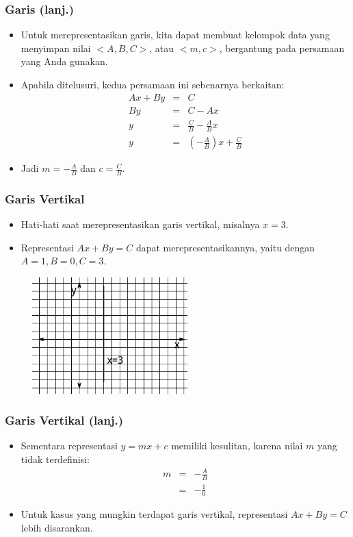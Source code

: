 \begin{frame}
\frametitle{Garis (lanj.)}
\begin{itemize}
  \item Untuk merepresentasikan garis, kita dapat membuat kelompok data yang menyimpan nilai $<A, B, C>$, atau $<m, c>$, bergantung pada persamaan yang Anda gunakan. 
  \item Apabila ditelusuri, kedua persamaan ini sebenarnya berkaitan:
\begin{eqnarray*}
Ax + By &=& C \\
By &=& C - Ax \\
y &=& \frac{C}{B} - \frac{A}{B}x \\
y &=& \left(-\frac{A}{B}\right)x + \frac{C}{B} 
\end{eqnarray*}
  \item Jadi $m = -\frac{A}{B}$ dan $c = \frac{C}{B}$.
\end{itemize}
\end{frame}

\begin{frame}
\frametitle{Garis Vertikal }
\begin{itemize}
  \item Hati-hati saat merepresentasikan garis vertikal, misalnya $x = 3$.
  \item Representasi $Ax + By = C$ dapat merepresentasikannya, yaitu dengan $A=1, B=0, C=3$.
\end{itemize}
\begin{figure}
  \includegraphics[width=6cm]{asset/vertical-line.pdf}
\end{figure}
\end{frame}

\begin{frame}
\frametitle{Garis Vertikal (lanj.)}
\begin{itemize}
  \item Sementara representasi $y = mx + c$ memiliki kesulitan, karena nilai $m$ yang tidak terdefinisi:
\begin{eqnarray*}
m &=& -\frac{A}{B} \\
&=& -\frac{1}{0}
\end{eqnarray*}
  \item Untuk kasus yang mungkin terdapat garis vertikal, representasi $Ax + By = C$ lebih disarankan.
\end{itemize}
\end{frame}


